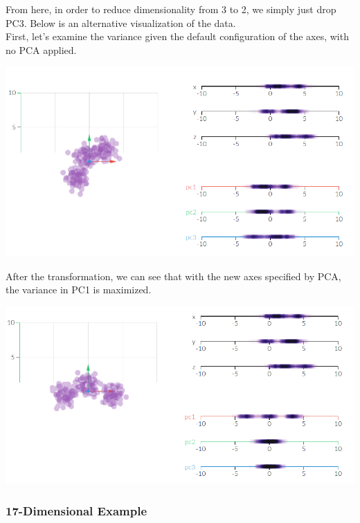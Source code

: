 \documentclass[english, 10pt]{article}
\begin{document}
\hfill \break From here, in order to reduce dimensionality from 3 to 2, we simply just drop PC3. Below is an alternative visualization of the data.\\

First, let's examine the variance given the default configuration of the axes, with no PCA applied.\\


{
\centering

\includegraphics[scale=0.5]{img/pcaanalysisbefore.png} 

}

\hfill \break After the transformation, we can see that with the new axes specified by PCA, the variance in PC1 is maximized.\\

{
\centering

\includegraphics[scale=0.5]{img/pcaanalysisafter.png}

}

\subsubsection{17-Dimensional Example}
\end{document}
